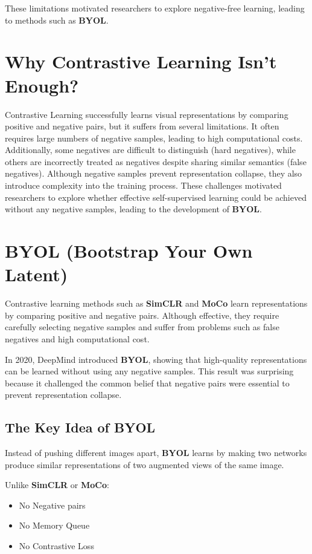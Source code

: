 These limitations motivated researchers to explore negative-free learning, leading to methods such as \textbf{BYOL}.

\section{Why Contrastive Learning Isn't Enough?}

Contrastive Learning successfully learns visual representations by comparing positive and negative pairs, but it suffers from several limitations. It often requires large numbers of negative samples, leading to high computational costs. Additionally, some negatives are difficult to distinguish (hard negatives), while others are incorrectly treated as negatives despite sharing similar semantics (false negatives). Although negative samples prevent representation collapse, they also introduce complexity into the training process. These challenges motivated researchers to explore whether effective self-supervised learning could be achieved without any negative samples, leading to the development of \textbf{BYOL}.

\section{BYOL (Bootstrap Your Own Latent)}

Contrastive learning methods such as \textbf{SimCLR} and \textbf{MoCo} learn representations by comparing positive and negative pairs. Although effective, they require carefully selecting negative samples and suffer from problems such as false negatives and high computational cost.

In 2020, DeepMind introduced \textbf{BYOL}, showing that high-quality representations can be learned without using any negative samples. This result was surprising because it challenged the common belief that negative pairs were essential to prevent representation collapse.

\subsection{The Key Idea of BYOL}

Instead of pushing different images apart, \textbf{BYOL} learns by making two networks produce similar representations of two augmented views of the same image.

Unlike \textbf{SimCLR} or \textbf{MoCo}:
\begin{itemize}
    \item No Negative pairs
    \item No Memory Queue
    \item No Contrastive Loss
\end{itemize}

